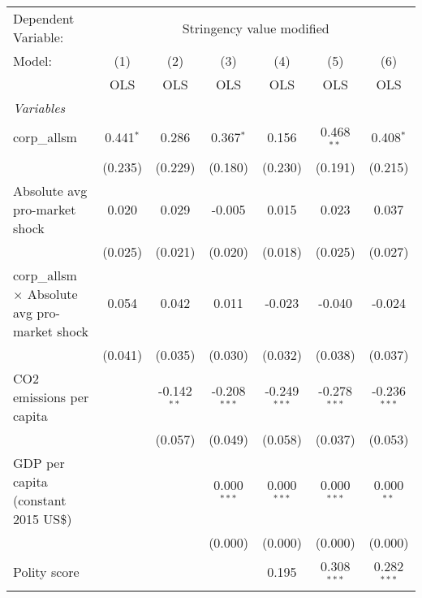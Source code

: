 
\begingroup
\centering
\begin{tabular}{lcccccc}
   \toprule
   Dependent Variable: & \multicolumn{6}{c}{Stringency value modified}\\
   Model:                                               & (1)         & (2)           & (3)            & (4)            & (5)            & (6)\\  
                                                        &  OLS        & OLS           & OLS            & OLS            & OLS            & OLS\\  
   \midrule
   \emph{Variables}\\
   corp\_allsm                                          & 0.441$^{*}$ & 0.286         & 0.367$^{*}$    & 0.156          & 0.468$^{**}$   & 0.408$^{*}$\\   
                                                        & (0.235)     & (0.229)       & (0.180)        & (0.230)        & (0.191)        & (0.215)\\   
   Absolute avg pro-market shock                        & 0.020       & 0.029         & -0.005         & 0.015          & 0.023          & 0.037\\   
                                                        & (0.025)     & (0.021)       & (0.020)        & (0.018)        & (0.025)        & (0.027)\\   
   corp\_allsm $\times$ Absolute avg pro-market shock   & 0.054       & 0.042         & 0.011          & -0.023         & -0.040         & -0.024\\   
                                                        & (0.041)     & (0.035)       & (0.030)        & (0.032)        & (0.038)        & (0.037)\\   
   CO2 emissions per capita                             &             & -0.142$^{**}$ & -0.208$^{***}$ & -0.249$^{***}$ & -0.278$^{***}$ & -0.236$^{***}$\\   
                                                        &             & (0.057)       & (0.049)        & (0.058)        & (0.037)        & (0.053)\\   
   GDP per capita (constant 2015 US\$)                  &             &               & 0.000$^{***}$  & 0.000$^{***}$  & 0.000$^{***}$  & 0.000$^{**}$\\   
                                                        &             &               & (0.000)        & (0.000)        & (0.000)        & (0.000)\\   
   Polity score                                         &             &               &                & 0.195          & 0.308$^{***}$  & 0.282$^{***}$\\   

\end{tabular}
